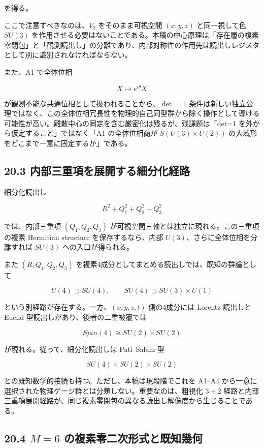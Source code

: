 \documentclass[
  a4paper,
]{ltjsarticle}
\begin{document}
を得る。

ここで注意すべきなのは、\(V_3\) をそのまま可視空間 \((x,y,z)\)
と同一視して色 \(SU(3)\)
を作用させる必要はないことである。本稿の中心原理は「存在層の複素零閉包」と「観測読出し」の分離であり、内部対称性の作用先は読出しレジスタとして別に識別されなければならない。

また、A1 で全体位相

\[
X\mapsto e^{i\theta}X
\]

が観測不能な共通位相として扱われることから、\(\det=1\)
条件は新しい独立公理ではなく、この全体位相冗長性を物理的自己同型群から除く操作として導ける可能性が高い。離散中心の同定を含む厳密化は残るが、残課題は「det=1
を外から仮定すること」ではなく「A1 の全体位相商が \(S(U(3)\times U(2))\)
の大域形をどこまで一意に固定するか」である。

\subsection{20.3
内部三重項を展開する細分化経路}\label{ux5185ux90e8ux4e09ux91cdux9805ux3092ux5c55ux958bux3059ux308bux7d30ux5206ux5316ux7d4cux8def}

細分化読出し

\[
R^2+Q_1^2+Q_2^2+Q_3^2
\]

では、内部三重項 \((Q_1,Q_2,Q_3)\)
が可視空間三軸とは独立に現れる。この三重項の複素 Hermitian structure
を保存するなら、内部 \(U(3)\)、さらに全体位相を分離すれば \(SU(3)\)
への入口が得られる。

また \((R,Q_1,Q_2,Q_3)\)
を複素4成分としてまとめる読出しでは、既知の群論として

\[
U(4)\supset SU(4),
\qquad
SU(4)\supset SU(3)\times U(1)
\]

という別経路が存在する。一方、\((x,y,z,t)\) 側の4成分には Lorentz
読出しと Euclid 型読出しがあり、後者の二重被覆では

\[
Spin(4)\cong SU(2)\times SU(2)
\]

が現れる。従って、細分化読出しは Pati--Salam 型

\[
SU(4)\times SU(2)\times SU(2)
\]

との既知数学的接続も持つ。ただし、本稿は現段階でこれを A1--A4
から一意に選択された物理ゲージ群とは分類しない。重要なのは、粗視化
\(3+2\)
経路と内部三重項展開経路が、同じ複素零閉包の異なる読出し解像度から生じることである。

\subsection{\texorpdfstring{20.4 \(M=6\)
の複素零二次形式と既知幾何}{20.4 M=6 の複素零二次形式と既知幾何}}\label{m6-ux306eux8907ux7d20ux96f6ux4e8cux6b21ux5f62ux5f0fux3068ux65e2ux77e5ux5e7eux4f55}
\end{document}
